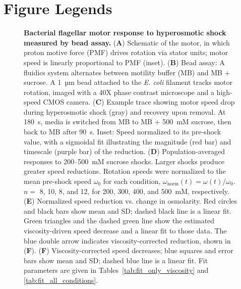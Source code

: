 \documentclass[twocolumn]{biophys-new}%
\begin{document}
\clearpage

\section*{Figure Legends}

\begin{figure}[htbp!]
	\centering
    \caption{\textbf{Bacterial flagellar motor response to hyperosmotic shock measured by bead assay.}
    (\textbf{A}) Schematic of the motor, in which proton motive force (PMF) drives rotation via stator units; motor speed is linearly proportional to PMF (inset). (\textbf{B}) Bead assay: A fluidics system alternates between motility buffer (MB) and MB + sucrose. A 1~µm bead attached to the \textit{E. coli} filament tracks motor rotation, imaged with a 40X phase contrast microscope and a high-speed CMOS camera.
    (\textbf{C}) Example trace showing motor speed drop during hyperosmotic shock (gray) and recovery upon removal. At 180~s, media is switched from MB to MB + 500~mM sucrose, then back to MB after 90~s. Inset: Speed normalized to its pre-shock value, with a sigmoidal fit illustrating the magnitude (red bar) and timescale (purple bar) of the reduction.
    (\textbf{D}) Population-averaged responses to 200--500~mM sucrose shocks. Larger shocks produce greater speed reductions. Rotation speeds were normalized to the mean pre-shock speed $\omega_{\mathrm{0}}$ for each condition, $\omega_{\mathrm{norm}}(t) = \omega(t)/\omega_{\mathrm{0}}$. $n=$ 8, 10, 8, and 12, for 200, 300, 400, and 500~mM, respectively. (\textbf{E}) Normalized speed reduction vs. change in osmolarity. Red circles and black  bars show mean and SD; dashed black line is a linear fit. Green triangles and the dashed green line show the estimated viscosity-driven speed decrease and a linear fit to those data. The blue double arrow indicates viscosity-corrected reduction, shown in (\textbf{F}).
    (\textbf{F}) Viscosity-corrected speed decreases; blue squares and error bars show mean and SD; dashed blue line is a linear fit. Fit  parameters are given in  Tables~\ref{tab:fit_only_viscosity} and \ref{tab:fit_all_conditions}.}
    \label{fig:sucrose_MB_shocks} 
\end{figure}   
\end{document}
